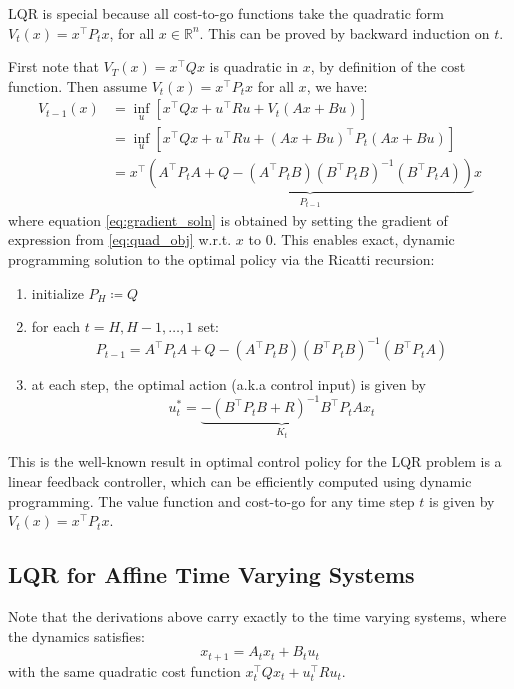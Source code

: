 \documentclass[a4paper]{article}
\begin{document}
LQR is special because all cost-to-go functions take the quadratic form $V_t(x) = x^\intercal P_t x$, for all $x\in\mathbb{R}^n$. This can be proved by backward induction on $t$. 

First note that $V_T(x) = x^\intercal Q x$ is quadratic in $x$, by definition of the cost function. Then assume $V_t(x) = x^\intercal P_t x$ for all $x$, we have:
\begin{align}
V_{t-1}(x) &= \inf\limits_{u} \left[ x^\intercal Qx+u^\intercal Ru+V_t(Ax+Bu) \right] \\
&= \inf\limits_{u} \left[ x^\intercal Qx+u^\intercal Ru+(Ax+Bu)^\intercal P_t (Ax+Bu) \right] \label{eq:quad_obj} \\
&= x^\intercal \underbrace{\left(A^\intercal P_tA+Q-(A^\intercal P_t B)(B^\intercal P_t B)^{-1}(B^\intercal P_t A)\right)}_{P_{t-1}}x
\label{eq:gradient_soln}
\end{align}
where equation \eqref{eq:gradient_soln} is obtained by setting the gradient of expression from \eqref{eq:quad_obj} w.r.t. $x$ to $0$. This enables exact, dynamic programming solution to the optimal policy via the Ricatti recursion:
\begin{enumerate}
\item initialize $P_H \coloneqq Q$
\item for each $t=H,H-1,\ldots,1$ set:
\begin{equation}
P_{t-1} = A^\intercal P_tA+Q-(A^\intercal P_t B)(B^\intercal P_t B)^{-1}(B^\intercal P_t A)
\end{equation}
\item at each step, the optimal action (a.k.a control input) is given by
\begin{equation}
u^*_t = \underbrace{-(B^\intercal P_tB+R)^{-1}B^\intercal P_tA}_{K_t}x_t
\end{equation}
\end{enumerate}
This is the well-known result in optimal control policy for the LQR problem is a linear feedback controller, which can be efficiently computed using dynamic programming. The value function and cost-to-go for any time step $t$ is given by $V_t(x) = x^\intercal P_t x$.
\subsection{LQR for Affine Time Varying Systems}
Note that the derivations above carry exactly to the time varying systems, where the dynamics satisfies:
\begin{equation}
x_{t+1} = A_t x_t + B_t u_t
\end{equation}
with the same quadratic cost function $x_t^\intercal Qx_t+u_t^\intercal Ru_t$.
\end{document}
